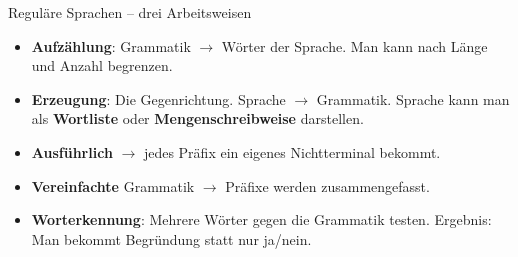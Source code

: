 \begin{fullframe}{Reguläre Sprachen -- drei Arbeitsweisen}
{              \begin{itemize}
                \item \textbf{Aufzählung}: Grammatik $\rightarrow$ Wörter der Sprache.
                Man kann nach Länge und Anzahl begrenzen.
                \item \textbf{Erzeugung}: Die Gegenrichtung.
                Sprache $\rightarrow$ Grammatik.
                Sprache kann man als \textbf{Wortliste} oder \textbf{Mengenschreibweise} darstellen.
                \item \textbf{Ausführlich} $\rightarrow$ jedes Präfix ein eigenes Nichtterminal bekommt.
                \item \textbf{Vereinfachte} Grammatik $\rightarrow$ Präfixe werden zusammengefasst.
                \item \textbf{Worterkennung}: Mehrere Wörter gegen die Grammatik testen.
                Ergebnis: Man bekommt Begründung statt nur ja/nein.
              \end{itemize}
  }
\end{fullframe}
